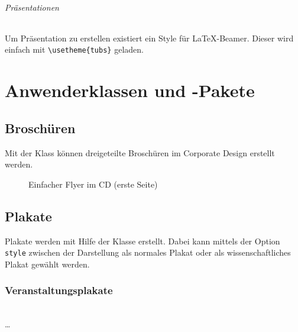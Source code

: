 \documentclass[a4paper,11pt]{tubsreprt}
\begin{document}
\paragraph{Präsentationen}
Um Präsentation zu erstellen existiert ein Style für \LaTeX-Beamer.
Dieser wird einfach mit \lstinline!\usetheme{tubs}! geladen.

\part{Anwenderklassen und -Pakete}




\chapter{Broschüren}

Mit der Klass  können dreigeteilte Broschüren
im Corporate Design erstellt werden.

\begin{figure}[!ht]
  \caption{Einfacher Flyer im CD (erste Seite)}
\end{figure}



\chapter{Plakate}

Plakate werden mit Hilfe der Klasse  erstellt.
Dabei kann mittels der Option \texttt{style} zwischen der Darstellung als
normales Plakat oder als wissenschaftliches Plakat gewählt werden.

\section{Veranstaltungsplakate}

\begin{Declaration}
    \\
  \quad\dots\\
\end{Declaration}
\end{document}
